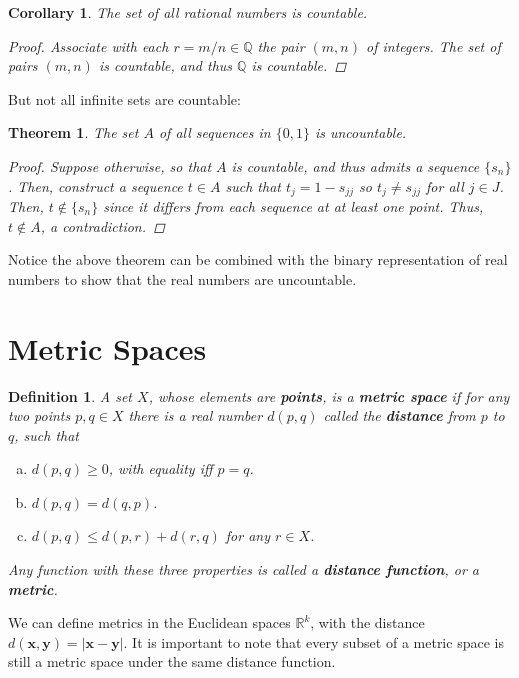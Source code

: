 \documentclass{scrbook}
\newcommand{\Q}{\mathbb{Q}}
\newcommand{\R}{\mathbb{R}}
\newtheorem{theorem}{Theorem}
\newtheorem{corollary}{Corollary}
\newtheorem{definition}{Definition}
\begin{document}
\begin{corollary}
The set of all rational numbers is countable.

\begin{proof}
Associate with each $r = m/n \in \Q$ the pair $(m, n)$ of integers. The set of pairs $(m, n)$ is countable, and thus $\Q$ is countable.
\end{proof}
\end{corollary}

But not all infinite sets are countable:

\begin{theorem}
The set $A$ of all sequences in $\{0, 1\}$ is uncountable.

\begin{proof}
Suppose otherwise, so that $A$ is countable, and thus admits a sequence $\{s_n\}$. Then, construct a sequence $t \in A$ such that $t_j = 1 - s_{jj}$ so $t_j \ne s_{jj}$ for all $j \in J$. Then, $t \not\in \{s_n\}$ since it differs from each sequence at at least one point. Thus, $t \not\in A$, a contradiction.
\end{proof}
\end{theorem}

Notice the above theorem can be combined with the binary representation of real numbers to show that the real numbers are uncountable.

\section{Metric Spaces}

\begin{definition}
A set $X$, whose elements are \textbf{points}, is a \textbf{metric space} if for any two points $p, q \in X$ there is a real number $d(p, q)$ called the \textbf{distance} from $p$ to $q$, such that
\begin{enumerate}[(a)]
\item $d(p, q) \ge 0$, with equality iff $p = q$.
\item $d(p, q) = d(q, p)$.
\item $d(p, q) \le d(p, r) + d(r, q)$ for any $r \in X$.
\end{enumerate}
Any function with these three properties is called a \textbf{distance function}, or a \textbf{metric}.
\end{definition}

We can define metrics in the Euclidean spaces $\R^k$, with the distance $d(\textbf{x}, \textbf{y}) = |\textbf{x} - \textbf{y}|$. It is important to note that every subset of a metric space is still a metric space under the same distance function.
\end{document}
